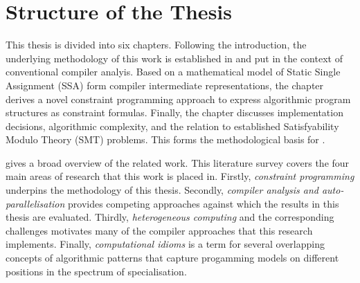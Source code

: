 



\newpage
\phantom{placeholder}
\newpage

\section{Structure of the Thesis}

    This thesis is divided into six chapters.
    Following the introduction, the underlying methodology of this work is
    established in {\bf{}} and put in the context of
    conventional compiler analyis.
    Based on a mathematical model of Static Single Assignment (SSA) form
    compiler intermediate representations, the chapter derives a novel
    constraint programming approach to express algorithmic program
    structures as constraint formulas.
    Finally, the chapter discusses implementation decisions,
    algorithmic complexity, and the relation to established Satisfyability
    Modulo Theory (SMT) problems.
    This forms the methodological basis for
    {\bf{}}.

    {\bf{}} gives a broad overview of the related work.
    This literature survey covers the four main areas of research that this work
    is placed in.
    Firstly, {\em constraint programming} underpins the methodology of this
    thesis.
    Secondly, {\em compiler analysis and auto-parallelisation} provides
    competing approaches against which the results in this thesis are evaluated.
    Thirdly, {\em heterogeneous computing} and the corresponding challenges
    motivates many of the compiler approaches that this research implements.
    Finally, {\em computational idioms} is a term for several overlapping
    concepts of algorithmic patterns that capture progamming models on different
    positions in the spectrum of specialisation.

